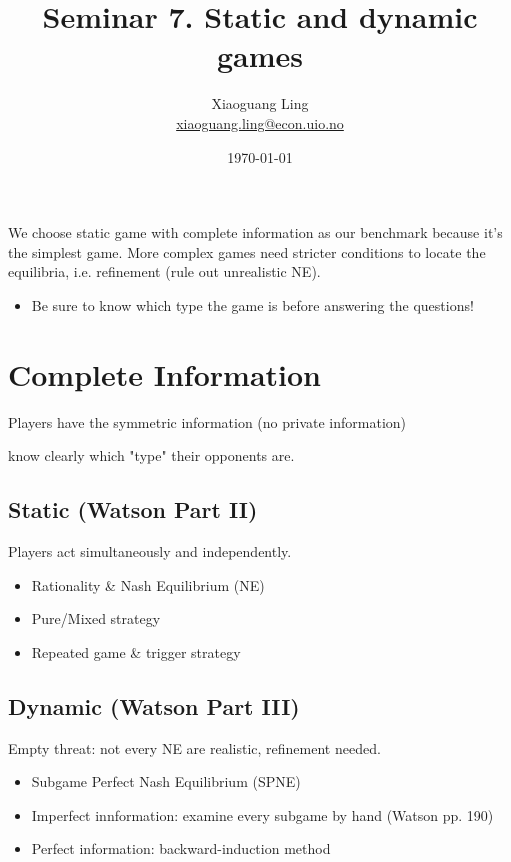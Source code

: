 \documentclass{article}
\title{Seminar 7. Static and dynamic games}
\author{Xiaoguang Ling \\  \href{xiaoguang.ling@econ.uio.no}{xiaoguang.ling@econ.uio.no}}
\date{\today}
\begin{document}
\maketitle

\begin{mdframed}[backgroundcolor=blue!20,linecolor=white]

We choose static game with complete information as our benchmark 
because it's the simplest game. More complex games need stricter conditions to locate the equilibria, i.e. refinement (rule out unrealistic NE). 
\begin{itemize}
\item Be sure to know which type the game is before answering
the questions!
\end{itemize}

\section*{Complete Information}

Players have the symmetric information (no private information)


know clearly which "type" their opponents are.


\subsection*{\hspace{4mm} Static (Watson Part II)}
\hspace{4mm} Players act simultaneously and independently.
\begin{itemize}
\item Rationality \& Nash Equilibrium (NE)
\item Pure/Mixed strategy
\item Repeated game \& trigger strategy
\end{itemize}


\subsection*{\hspace{4mm} Dynamic (Watson Part III)}
\hspace{4mm} Empty threat: not every NE are realistic, refinement needed.
\begin{itemize}	
\item Subgame Perfect Nash Equilibrium (SPNE)
\item Imperfect innformation: examine every subgame by hand (Watson pp. 190)
\item Perfect information: backward-induction method
\end{itemize}


\end{mdframed}
\end{document}
